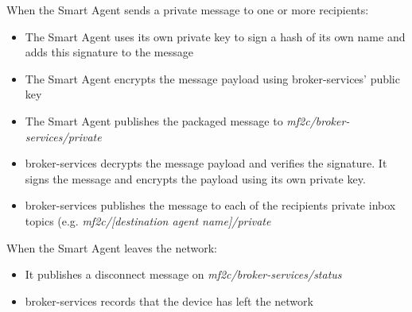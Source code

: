 When the Smart Agent sends a private message to one or more recipients:
\begin{itemize}
    \item The Smart Agent uses its own private key to sign a hash of its own name and adds this signature to the message
    \item The Smart Agent encrypts the message payload using broker-services' public key
    \item The Smart Agent publishes the packaged message to \textit{mf2c/broker-services/private}
    \item broker-services decrypts the message payload and verifies the signature. It signs the message and encrypts the payload using its own private key.
    \item broker-services publishes the message to each of the recipients private inbox topics (e.g. \textit{mf2c/[destination agent name]/private}
\end{itemize}


When the Smart Agent leaves the network:
\begin{itemize}
    \item It publishes a disconnect message on \textit{mf2c/broker-services/status}
    \item broker-services records that the device has left the network
\end{itemize}
